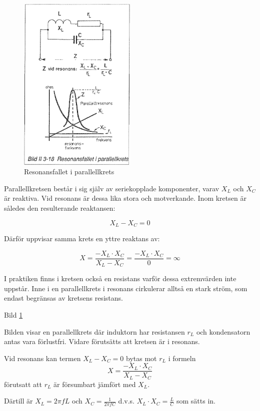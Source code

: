 \begin{figure}
\includegraphics[width=0.5\textwidth]{images/bild_2_3-18}
\caption{Resonansfallet i parallellkrets}
\label{fig:BildII3-18}
\end{figure}

Parallellkretsen består i sig själv av seriekopplade komponenter, varav
\(X_L\) och \(X_C\) är reaktiva. Vid resonans är dessa lika stora och
motverkande. Inom kretsen är således den resulterande reaktansen:

\[X_L - X_C = 0\]

Därför uppvisar samma krets en yttre reaktans av:

\[
  X = \frac{-X_L \cdot X_C}{X_L - X_C}
  = \frac{-X_L \cdot X_C}{0}
  = \infty
\]

I praktiken finns i kretsen också en resistans varför dessa extremvärden inte
uppstår. Inne i en parallellkrets i resonans cirkulerar alltså en stark ström,
som endast begränsas av kretsens resistans.

Bild \ref{fig:BildII3-18}

Bilden visar en parallellkrets där induktorn har resistansen \(r_L\) och
kondensatorn antas vara förlustfri. Vidare förutsätts att kretsen är i resonans.

Vid resonans kan termen \(X_L - X_C = 0\) bytas mot \(r_L\) i formeln
\[X = \frac{-X_L \cdot X_C}{X_L - X_C}\] förutsatt att \(r_L\) är försumbart
jämfört med \(X_L\).

Därtill är \(X_L = 2πfL\) och \(X_C = \frac{1}{2πfC}\) d.v.s.
\(X_L \cdot X_C = \frac{L}{C}\) som sätts in.

